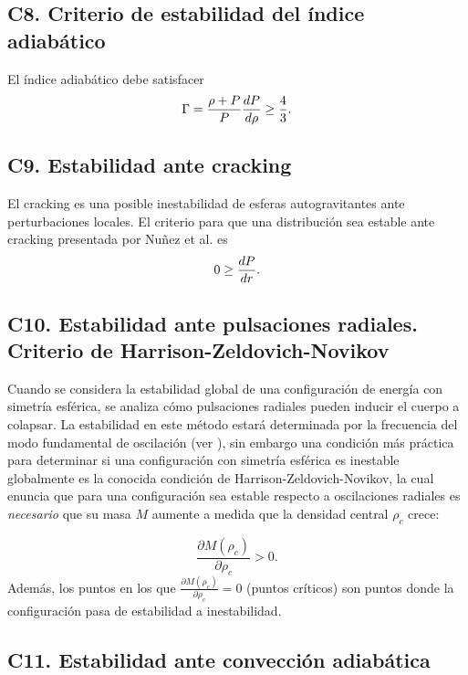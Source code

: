 \subsection*{C8. Criterio de estabilidad del índice adiabático }
El índice adiabático debe satisfacer
\begin{equation}
    \Gamma = \frac { \rho + P  } { P } \dv{P}{\rho} \geq \frac{4}{3}.
\end{equation}

\subsection*{C9. Estabilidad ante cracking}
El cracking es una posible inestabilidad de esferas autogravitantes ante perturbaciones locales. El criterio para que una distribución sea estable ante cracking presentada por Nuñez et al. \cite{Gonzalez2014CrackingSpheres} es
\begin{equation}
    0 \geq \dv{P}{r}.
\end{equation}

\subsection*{C10. Estabilidad ante pulsaciones radiales. Criterio de Harrison-Zeldovich-Novikov}
Cuando se considera la estabilidad global de una configuraci\'on de energía con simetría esférica, se analiza cómo pulsaciones radiales pueden inducir el cuerpo a colapsar. La estabilidad en este método estará determinada por la frecuencia del modo fundamental de oscilación (ver \cite{Haensel2007NeutronStructure,Shapiro1983}), sin embargo una condición más práctica para determinar si una configuraci\'on con simetría esférica es inestable globalmente es la conocida condición de Harrison-Zeldovich-Novikov, la cual enuncia que para una configuración sea estable respecto a oscilaciones radiales es \emph{necesario} que su masa $M$ aumente a medida que la densidad central $\rho_{c}$ crece: 

\begin{equation}
    \frac { \partial M \left( \rho _ { c } \right) } { \partial \rho _ { c } } > 0.
\end{equation}
Además, los puntos en los que $\frac { \partial M \left( \rho _ { c } \right) } { \partial \rho _ { c } } = 0$ (puntos críticos) son puntos donde la configuraci\'on pasa de estabilidad a inestabilidad.



\subsection*{C11. Estabilidad ante convección adiabática}

